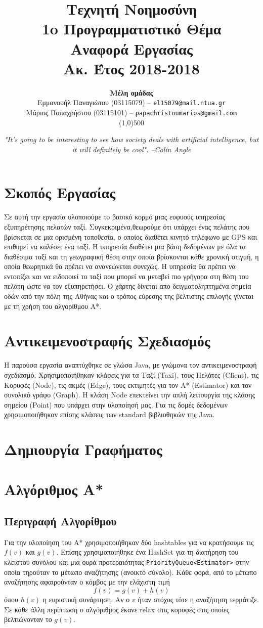 \documentclass[a4paper,oneside,12pt]{article}
\title{ \textbf{Τεχνητή Νοημοσύνη}  \\ 1o Προγραμματιστικό Θέμα \\ Αναφορά Εργασίας \\ \small{Ακ. Έτος 2018-2018}}
\author{\textbf{Μέλη ομάδας} \\ Εμμανουήλ Παναγιώτου (03115079) -- \texttt{el15079@mail.ntua.gr} \\  Μάριος Παπαχρήστου (03115101) -- \texttt{papachristoumarios@gmail.com}   \\ \line(1,0){500}}
\date{\emph{"It's going to be interesting to see how society deals with artificial intelligence, but it will definitely be cool". --Colin Angle}}
\begin{document}
\maketitle

\section{Σκοπός Εργασίας} 

Σε αυτή την εργασία υλοποιούμε το βασικό κορμό μιας ευφυούς υπηρεσίας εξυπηρέτησης πελατών ταξί. Συγκεκριμένα,θεωρούμε ότι υπάρχει ένας πελάτης που βρίσκεται σε μια ορισμένη τοποθεσία, ο οποίος διαθέτει κινητό τηλέφωνο με GPS και επιθυμεί να καλέσει ένα ταξί. Η υπηρεσία διαθέτει μια βάση δεδομένων με όλα τα διαθέσιμα ταξί και τη γεωγραφική θέση στην
οποία βρίσκονται κάθε χρονική στιγμή, η οποία θεωρητικά θα πρέπει να ανανεώνεται συνεχώς. Η υπηρεσία θα πρέπει να εντοπίζει και να ειδοποιεί το ταξί που μπορεί να μεταβεί πιο γρήγορα στη θέση του πελάτη ώστε να τον εξυπηρετήσει. Ο χάρτης δίνεται απο δειγματοληπτημένα σημεία οδών από την πόλη της Αθήνας και ο τρόπος εύρεσης της βέλτιστης επιλογής γίνεται με τη χρήση του αλγορίθμου Α*. 

\section{Αντικειμενοστραφής Σχεδιασμός} 

Η παρούσα εργασία αναπτύχθηκε σε γλώσα Java, με γνώμονα τον αντικειμενοστραφή σχεδιασμό. Χρησιμοποιήθηκαν κλάσεις για τα Ταξί (Taxi), τους Πελάτες (Client), τις Κορυφές (Node), τις ακμές (Edge), τους εκτιμητές για τον Α* (Estimator) και τον συνολικό γράφο (Graph). Η κλάση Node επεκτείνει την απλή λειτουργία της κλάσης σημείου (Point) που υπάρχει στην υλοποίησή μας. Για τις δομές δεδομένων χρησιμοποιήθηκαν επίσης κλάσεις των standard βιβλιοθηκών της Java. 

\section{Δημιουργία Γραφήματος}


\section{Αλγόριθμος Α*}

\subsection{Περιγραφή Αλγορίθμου}
Για την υλοποίηση του Α* χρησιμοποιήθηκαν δύο hashtables για να κρατήσουμε τις $f(v)$ και $g(v)$. Επίσης χρησιμοποιήθηκε ένα HashSet για τη διατήρηση του κλειστού συνόλου και μια ουρά προτεραιότητας \texttt{PriorityQueue<Estimator>} στην οποία τηρούταν το μέτωπο αναζήτησης (ανοικτό σύνολο). Κάθε φορά, από το μέτωπο αναζήτησης αφαιρούνταν ο κόμβος με την ελάχιστη τιμή $$f(v) = g(v) + h(v)$$ όπου $h(v)$ η ευριστική συνάρτηση. Αν ο $v$ ήταν στόχος τότε η αναζήτηση τερμάτιζε. Σε κάθε άλλη περίπτωση ο αλγόριθμος έκανε relax στις κορυφές στις οποίες βελτιώνονταν το $g(v)$. 
\end{document}
